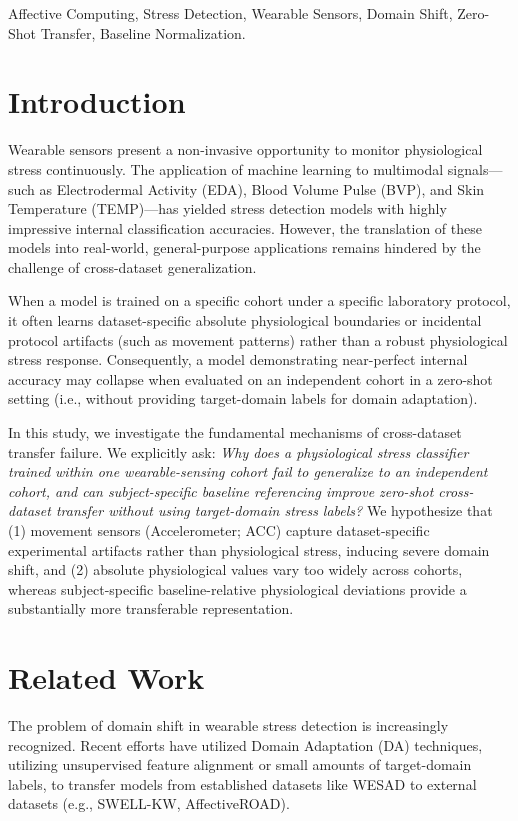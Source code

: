 \documentclass[journal]{IEEEtran}
\begin{document}
\begin{IEEEkeywords}
Affective Computing, Stress Detection, Wearable Sensors, Domain Shift, Zero-Shot Transfer, Baseline Normalization.
\end{IEEEkeywords}

\section{Introduction}
Wearable sensors present a non-invasive opportunity to monitor physiological stress continuously. The application of machine learning to multimodal signals—such as Electrodermal Activity (EDA), Blood Volume Pulse (BVP), and Skin Temperature (TEMP)—has yielded stress detection models with highly impressive internal classification accuracies. However, the translation of these models into real-world, general-purpose applications remains hindered by the challenge of cross-dataset generalization. 

When a model is trained on a specific cohort under a specific laboratory protocol, it often learns dataset-specific absolute physiological boundaries or incidental protocol artifacts (such as movement patterns) rather than a robust physiological stress response. Consequently, a model demonstrating near-perfect internal accuracy may collapse when evaluated on an independent cohort in a zero-shot setting (i.e., without providing target-domain labels for domain adaptation). 

In this study, we investigate the fundamental mechanisms of cross-dataset transfer failure. We explicitly ask: \textit{Why does a physiological stress classifier trained within one wearable-sensing cohort fail to generalize to an independent cohort, and can subject-specific baseline referencing improve zero-shot cross-dataset transfer without using target-domain stress labels?} We hypothesize that (1) movement sensors (Accelerometer; ACC) capture dataset-specific experimental artifacts rather than physiological stress, inducing severe domain shift, and (2) absolute physiological values vary too widely across cohorts, whereas subject-specific baseline-relative physiological deviations provide a substantially more transferable representation.

\section{Related Work}
The problem of domain shift in wearable stress detection is increasingly recognized. Recent efforts have utilized Domain Adaptation (DA) techniques, utilizing unsupervised feature alignment or small amounts of target-domain labels, to transfer models from established datasets like WESAD to external datasets (e.g., SWELL-KW, AffectiveROAD). 
\end{document}
